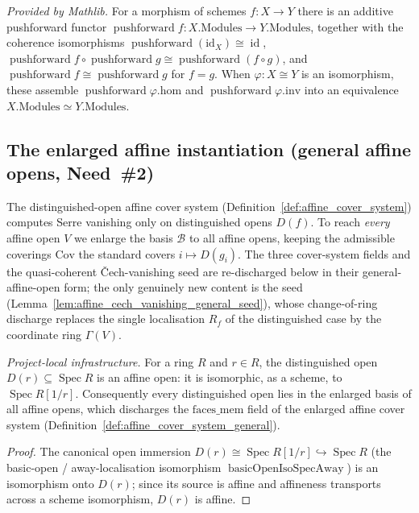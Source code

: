 \begin{lemma}
  \label{lem:modules_pushforward_mathlib}
  \mathlibok
  \textit{Provided by Mathlib.}
  For a morphism of schemes \(f : X \to Y\) there is an additive pushforward functor
  \(\operatorname{pushforward} f : X.\mathrm{Modules} \to Y.\mathrm{Modules}\), together with the
  coherence isomorphisms \(\operatorname{pushforward}(\mathrm{id}_X) \cong \operatorname{id}\),
  \(\operatorname{pushforward} f \circ \operatorname{pushforward} g \cong
  \operatorname{pushforward}(f \circ g)\), and \(\operatorname{pushforward} f \cong
  \operatorname{pushforward} g\) for \(f = g\). When \(\varphi : X \cong Y\) is an isomorphism, these
  assemble \(\operatorname{pushforward}\varphi.\mathrm{hom}\) and
  \(\operatorname{pushforward}\varphi.\mathrm{inv}\) into an equivalence
  \(X.\mathrm{Modules} \simeq Y.\mathrm{Modules}\).
\end{lemma}

\subsection{The enlarged affine instantiation (general affine opens, Need~\#2)}

The distinguished-open affine cover system (Definition~\ref{def:affine_cover_system}) computes Serre
vanishing only on distinguished opens \(D(f)\). To reach \emph{every} affine open \(V\) we enlarge the
basis \(\mathcal{B}\) to all affine opens, keeping the admissible coverings \(\mathrm{Cov}\) the standard
covers \(i \mapsto D(g_i)\). The three cover-system fields and the quasi-coherent {\v C}ech-vanishing seed
are re-discharged below in their general-affine-open form; the only genuinely new content is the seed
(Lemma~\ref{lem:affine_cech_vanishing_general_seed}), whose change-of-ring discharge replaces the single
localisation \(R_f\) of the distinguished case by the coordinate ring \(\Gamma(V)\).

\begin{lemma}\leanok
  \label{lem:isAffineOpen_specBasicOpen}
  \textit{Project-local infrastructure.}
  For a ring \(R\) and \(r \in R\), the distinguished open \(D(r) \subseteq \operatorname{Spec} R\) is an
  affine open: it is isomorphic, as a scheme, to \(\operatorname{Spec} R[1/r]\). Consequently every
  distinguished open lies in the enlarged basis of all affine opens, which discharges the
  \(\mathrm{faces\_mem}\) field of the enlarged affine cover system
  (Definition~\ref{def:affine_cover_system_general}).
\end{lemma}
\begin{proof}


\leanok
  The canonical open immersion \(D(r) \cong \operatorname{Spec} R[1/r] \hookrightarrow \operatorname{Spec}
  R\) (the basic-open / away-localisation isomorphism \(\operatorname{basicOpenIsoSpecAway}\)) is an
  isomorphism onto \(D(r)\); since its source is affine and affineness transports across a scheme
  isomorphism, \(D(r)\) is affine.
\end{proof}

